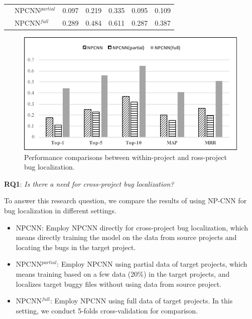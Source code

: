 \begin{table}[htbp]
{\begin{tabular}{c|l|c|c|c|c|c}
          & NPCNN$^{partial}$ & 0.097  & 0.219  & 0.335  & 0.095  & 0.109  \\
          & NPCNN$^{full}$ & 0.289  & 0.484  & 0.611  & 0.287  & 0.387  \\
          \bottomrule
    \end{tabular}%
    }

  \label{tab:within}%
\end{table}%


\begin{figure}[hbt]
\centering
\includegraphics[width = 0.9\columnwidth]{pic/results1.pdf}
\caption{Performance comparisons between within-project and ross-project bug localization.}
\label{fig:results1}
\end{figure}


\textbf{RQ1}: \textit{Is there a need for cross-project bug localization?}

To answer this research question, we compare the results of using NP-CNN for bug localization in different settings.

\begin{itemize}
  \item NPCNN: Employ NPCNN directly for cross-project bug localization, which means directly training the model on the data from source projects and locating the bugs in the target project.
  \item NPCNN$^{partial}$: Employ NPCNN using partial data of target projects, which means training based on a few data (20\%) in the target projects, and localizes target buggy files without using data from source project.
  \item NPCNN$^{full}$: Employ NPCNN using full data of target projects. In this setting, we conduct 5-folds cross-validation for comparison.
\end{itemize}

